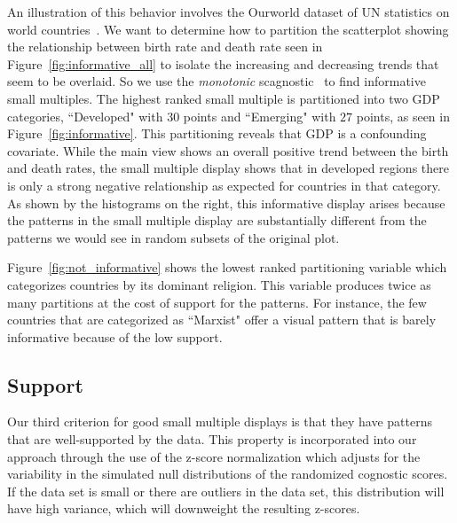 An illustration of this behavior involves the Ourworld dataset of UN statistics on world countries~\cite{Wilkinson2005GG}. We want to determine how to partition the scatterplot showing the relationship between birth rate and death rate seen in Figure~\ref{fig:informative_all} to isolate the increasing and decreasing trends that seem to be overlaid. So we use the \emph{monotonic} scagnostic~\cite{Wilkinson2005} to find informative small multiples. The highest ranked small multiple is partitioned into two GDP categories, ``Developed" with $30$ points and ``Emerging" with $27$ points, as seen in Figure~\ref{fig:informative}. This partitioning reveals that GDP is a confounding covariate. While the main view shows an overall positive trend between the birth and death rates, the small multiple display shows that in developed regions there is only a strong negative relationship as expected for countries in that category. As shown by the histograms on the right, this informative display arises because the patterns in the small multiple display are substantially different from the patterns we would see in random subsets of the original plot.

Figure~\ref{fig:not_informative} shows the lowest ranked partitioning variable which categorizes countries by its dominant religion. This variable produces twice as many partitions at the cost of support for the patterns. For instance, the few countries that are categorized as ``Marxist" offer a visual pattern that is barely informative because of the low support. 



\subsection{Support}
Our third criterion for good small multiple displays is that they have patterns that are well-supported by the data. This property is incorporated into our approach through the use of the z-score normalization which adjusts for the variability in the simulated null distributions of the randomized cognostic scores. If the data set is small or there are outliers in the data set, this distribution will have high variance, which will downweight the resulting z-scores.


